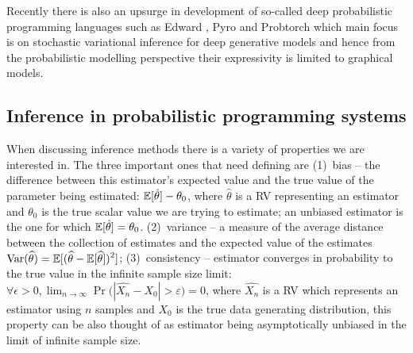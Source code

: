 \documentclass[12pt]{article}
\begin{document}
Recently there is also an upsurge in development of so-called deep probabilistic programming languages such as Edward \citep{TranEtAl2016}, Pyro \citep{Pyro2018} and Probtorch \citep{Siddharth2017} which main focus is on stochastic variational inference for deep generative models and hence from the probabilistic modelling perspective their expressivity is limited to graphical models.




\subsection{Inference in probabilistic programming systems}
\label{sec:inference-prob-prog}

When discussing inference methods there is a variety of properties we are interested in.
The three important ones that need defining are 
(1)~bias -- the difference between this estimator's expected value and the true value of the parameter being estimated: 
$\mathbb{E} [\hat{\theta}] - \theta_0$, 
where $\hat{\theta}$ is a RV representing an estimator and $\theta_0$ is the true scalar value we are trying to estimate; 
an unbiased estimator is the one for which $\mathbb{E} [\hat{\theta}] = \theta_0$.
(2)~variance -- a measure of the average distance between the collection of estimates and the expected value of the estimates
${\displaystyle \operatorname {Var} ({\widehat {\theta }})=\mathbb{E} [({\widehat {\theta }}-\mathbb{E} [{\widehat {\theta }}])^{2}]}$;
(3)~consistency -- estimator converges in probability to the true value in the infinite sample size limit: 
$\forall \epsilon>0, \lim _{n\to \infty}\Pr {\big (}|\hat{X_{n}}-X_0| > \varepsilon {\big )}=0$, 
where $\hat{X_n}$ is a RV which represents an estimator using $n$ samples and $X_0$ is the true data generating distribution,
this property can be also thought of as estimator being asymptotically unbiased in the limit of infinite sample size.
\end{document}
